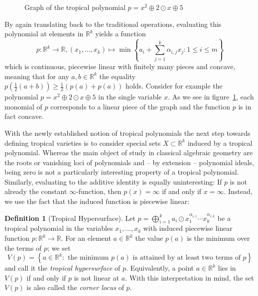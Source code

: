 \documentclass[
  paper=a4,
  DIV=14,
  fontsize=12pt,
  titlepage,
  bibliography=totoc,
  listof=totoc,
  pagesize=pdftex
]{scrartcl}
\numberwithin{figure}{section}
\numberwithin{equation}{section}
\numberwithin{table}{section}
\newcommand*\setR{\mathds{R}}
\theoremstyle{definition}
\newtheorem{definition}{Definition}
\numberwithin{definition}{section}
\begin{document}
\begin{figure}[tbh]
  \centering
  \caption{Graph of the tropical polynomial $p=x^2\oplus 2\odot x \oplus 5$}
  \label{fig:tropPolyPlot}
\end{figure}

By again translating back to the traditional operations, evaluating this polynomial at
elements in $\setR^k$ yields a function
\[
  p : \setR^k \to \setR, (x_1, \dots, x_k) \mapsto
  \min\left\{
    a_i + \sum_{j=1}^k \alpha_{i,j}x_j : 1 \leq i \leq m
  \right\}
\]
which is continuous, piecewise linear with finitely many pieces and concave, meaning that
for any $a,b \in \setR^k$ the equality $p(\frac12(a+b)) \geq \frac12(p(a)+p(a))$ holds.
Consider for example the polynomial $p = x^2 \oplus 2\odot x \oplus 5$ in the single
variable $x$. As we see in figure~\ref{fig:tropPolyPlot}, each monomial of $p$ corresponds
to a linear piece of the graph and the function $p$ is in fact concave.

With the newly established notion of tropical polynomials the next step towards defining
tropical varieties is to consider special sets $X \subset \setR^k$ induced by a tropical
polynomial. Whereas the main object of study in classical algebraic geometry are the roots
or vanishing loci of polynomials and -- by extension -- polynomial ideals, being zero is
not a particularly interesting property of a tropical polynomial. Similarly, evaluating to
the additive identity is equally uninteresting: If $p$ is not already the constant
$\infty$-function, then $p(x)=\infty$ if and only if $x=\infty$. Instead, we use the fact
that the induced function is piecewise linear:

\begin{definition}[Tropical Hypersurface]
  Let $p = \bigoplus_{i=1}^k a_i \odot x_1^{\alpha_{i,1}}\cdots x_k^{\alpha_{i,k}}$ be a
  tropical polynomial in the variables $x_1, \dots, x_k$ with induced piecewise linear
  function $p:\setR^k \to \setR$. For an element $a\in \setR^k$ the value $p(a)$ is the
  minimum over the terms of $p$; we set
  \[
    V(p) = \left\{
      a \in \setR^k :
      \text{ the minimum $p(a)$ is attained by at least two terms of $p$}
    \right\}
  \]
  and call it the \emph{tropical hypersurface} of $p$. Equivalently, a point $a\in
  \setR^k$ lies in $V(p)$ if and only if $p$ is not linear at $a$. With this
  interpretation in mind, the set $V(p)$ is also called the \emph{corner locus} of $p$.
  \label{def:tropHypersurface}
\end{definition}
\end{document}
